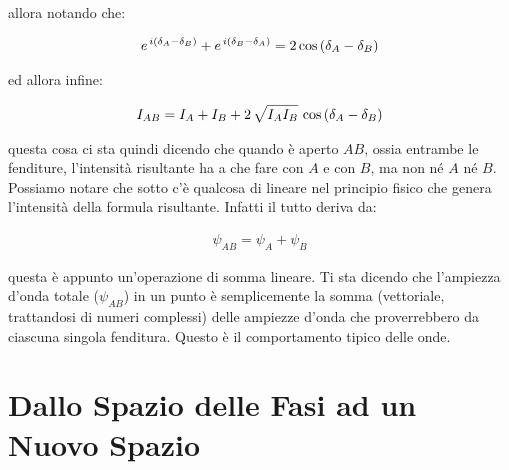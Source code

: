 	allora notando che:

\begin{align*}
	e^{ \, i \qty( \delta_A - \delta_B )} + e^{ \, i \qty( \delta_B - \delta_A )} = 2 \cos\qty(\delta_A - \delta_B)
\end{align*}

	ed allora infine:

\begin{align*}
	I_{AB} = I_A + I_B + 2 \, \sqrt{I_A I_B} \, \cos\qty(\delta_A - \delta_B)
\end{align*}

	questa cosa ci sta quindi dicendo che quando è aperto $AB$, ossia entrambe le fenditure, l'intensità risultante ha a che fare con $A$ e con $B$, ma non né $A$ né $B$. Possiamo notare che sotto c'è qualcosa di lineare nel principio fisico che genera l'intensità della formula risultante. Infatti il tutto deriva da:

\begin{align*}
	\psi_{AB} = \psi_A + \psi_B
\end{align*}

	questa è appunto un'operazione di somma lineare. Ti sta dicendo che l'ampiezza d'onda totale ($\psi_{AB}$) in un punto è semplicemente la somma (vettoriale, trattandosi di numeri complessi) delle ampiezze d'onda che proverrebbero da ciascuna singola fenditura. Questo è il comportamento tipico delle onde. 

\section{Dallo Spazio delle Fasi ad un Nuovo Spazio}
	

